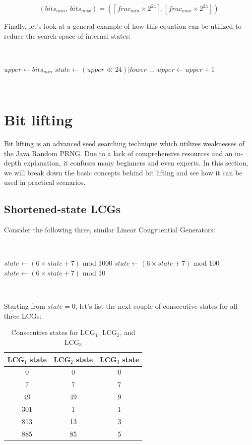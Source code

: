 \documentclass{article}
\begin{document}
\begin{equation}
    (bits_{min}, \ bits_{max}) = \left( \left\lceil frac_{min} \times 2^{24} \right\rceil, \left\lfloor frac_{max} \times 2^{24} \right\rfloor \right)
\end{equation}

Finally, let's look at a general example of how this equation can be utilized to reduce the search space of internal states:

\
\begin{algorithmic}
\State $upper \gets bits_{min}$
        \State $state \gets (upper \ll 24) | lower$
        \State ...
    \EndFor
    \State $upper \gets upper + 1$
\EndWhile
\end{algorithmic}
\ \

\section{Bit lifting}

Bit lifting is an advanced seed searching technique which utilizes weaknesses of the Java Random PRNG. Due to a lack of comprehensive resources and an in-depth explanation, it confuses many beginners and even experts. In this section, we will break down the basic concepts behind bit lifting and see how it can be used in practical scenarios.

\subsection{Shortened-state LCGs}

Consider the following three, similar Linear Congruential Generators:

\
\begin{algorithmic}
    \State $state \gets (6 \times state + 7)$ mod 1000
    \Comment{LCG$_1$}
    \State $state \gets (6 \times state + 7)$ mod 100
    \Comment{LCG$_2$}
    \State $state \gets (6 \times state + 7)$ mod 10
    \Comment{LCG$_3$}
\end{algorithmic}
\ \

\noindent Starting from $state = 0$, let’s list the next couple of consecutive states for all three LCGs:

\begin{table}[h]
    \centering
    \begin{tabular}{|c|c|c|}
    \hline
         LCG$_1$ state & LCG$_2$ state & LCG$_3$ state \\
    \hline
         0 & 0 & 0   \\
         7 & 7 & 7   \\
         49 & 49 & 9  \\
         301 & 1 & 1   \\
         813 & 13 & 3  \\
         885 & 85 & 5  \\
    \hline
    \end{tabular}
    \caption{Consecutive states for LCG$_1$, LCG$_2$, and LCG$_3$}
    \label{tab:lcgs}
\end{table}
\end{document}
